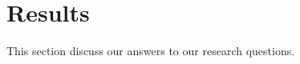 \section{Results} \label{results}

This section discuss our answers to our research questions.






